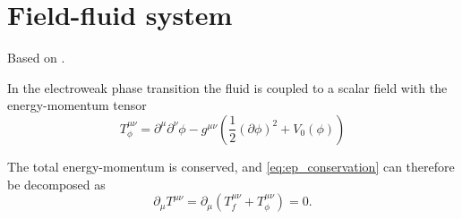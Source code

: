 \section{Field-fluid system}
Based on \cite{moore_pt_1995}.

In the electroweak phase transition the fluid is coupled to a scalar field with the energy-momentum tensor
\cites[eq. 2.9]{hindmarsh_gw_pt_2019}
\begin{equation}
T_\phi^{\mu \nu}
= \partial^\mu \partial^\nu \phi
- g^{\mu \nu} \left(\frac{1}{2} (\partial \phi)^2 + V_0 (\phi) \right)
\end{equation}

The total energy-momentum is conserved, and \ref{eq:ep_conservation} can therefore be decomposed as
\cite[eq. 5.17]{lecture_notes}
\begin{equation}
\partial_\mu T^{\mu \nu} = \partial_\mu (T_f^{\mu \nu} + T_\phi^{\mu \nu}) = 0.
\label{eq:ep_conservation_total}
\end{equation}
